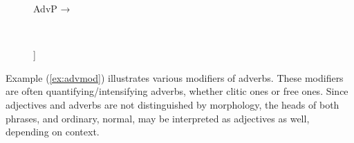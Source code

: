 \begin{figure}[h]
\ex\label{ex:advpstruct}
AdvP →  
\xe
\end{figure}

\begin{figure}[h]
\ex~\label{ex:advpcstruct}
\begin{forest}
[{\anno[\elem{\Adjc}]{AdvP}}
		[\anno{\xhead{Adv}}]
		[{\anno[{\elem{\Adjc}}]{AdvP}}]
]
\end{forest}
\xe
\end{figure}

Example (\ref{ex:advmod}) illustrates various modifiers of adverbs. These
modifiers are often quantifying/intensifying adverbs, whether clitic ones or
free ones. Since adjectives and adverbs are not distinguished by morphology,
the heads of both phrases,  and 
{ordinary, normal}, may be interpreted as adjectives as well, depending on
context.

